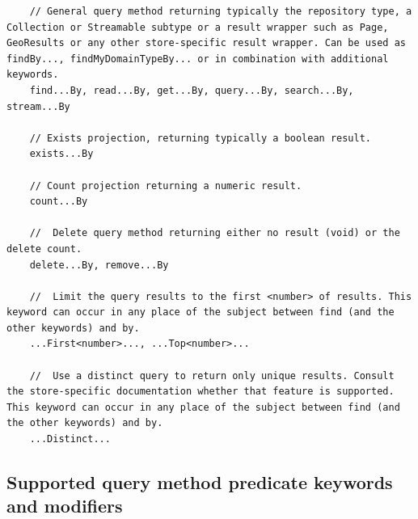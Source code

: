 \documentclass{scrartcl}
\begin{document}
\begin{lstlisting}
    // General query method returning typically the repository type, a Collection or Streamable subtype or a result wrapper such as Page, GeoResults or any other store-specific result wrapper. Can be used as findBy..., findMyDomainTypeBy... or in combination with additional keywords.
    find...By, read...By, get...By, query...By, search...By, stream...By

    // Exists projection, returning typically a boolean result.
    exists...By

    // Count projection returning a numeric result.
    count...By

    //  Delete query method returning either no result (void) or the delete count.
    delete...By, remove...By

    //  Limit the query results to the first <number> of results. This keyword can occur in any place of the subject between find (and the other keywords) and by.
    ...First<number>..., ...Top<number>...

    //  Use a distinct query to return only unique results. Consult the store-specific documentation whether that feature is supported. This keyword can occur in any place of the subject between find (and the other keywords) and by.
    ...Distinct...
\end{lstlisting}

\subsection{Supported query method predicate keywords and modifiers}
\end{document}
